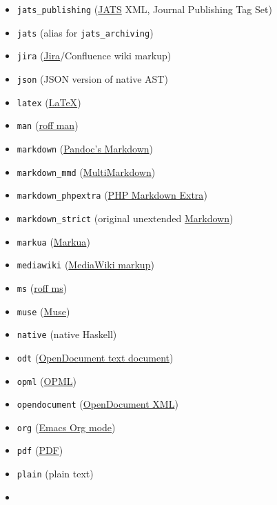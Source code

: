 \documentclass[
]{article}
\begin{document}
\begin{description}
\begin{itemize}
\item
  \texttt{jats\_publishing} (\href{https://jats.nlm.nih.gov}{JATS} XML,
  Journal Publishing Tag Set)
\item
  \texttt{jats} (alias for \texttt{jats\_archiving})
\item
  \texttt{jira}
  (\href{https://jira.atlassian.com/secure/WikiRendererHelpAction.jspa?section=all}{Jira}/Confluence
  wiki markup)
\item
  \texttt{json} (JSON version of native AST)
\item
  \texttt{latex} (\href{https://www.latex-project.org/}{LaTeX})
\item
  \texttt{man} (\href{https://man.cx/groff_man(7)}{roff man})
\item
  \texttt{markdown} (\protect\hyperlink{pandocs-markdown}{Pandoc's
  Markdown})
\item
  \texttt{markdown\_mmd}
  (\href{https://fletcherpenney.net/multimarkdown/}{MultiMarkdown})
\item
  \texttt{markdown\_phpextra}
  (\href{https://michelf.ca/projects/php-markdown/extra/}{PHP Markdown
  Extra})
\item
  \texttt{markdown\_strict} (original unextended
  \href{https://daringfireball.net/projects/markdown/}{Markdown})
\item
  \texttt{markua} (\href{https://leanpub.com/markua/read}{Markua})
\item
  \texttt{mediawiki}
  (\href{https://www.mediawiki.org/wiki/Help:Formatting}{MediaWiki
  markup})
\item
  \texttt{ms} (\href{https://man.cx/groff_ms(7)}{roff ms})
\item
  \texttt{muse} (\href{https://amusewiki.org/library/manual}{Muse})
\item
  \texttt{native} (native Haskell)
\item
  \texttt{odt}
  (\href{https://en.wikipedia.org/wiki/OpenDocument}{OpenDocument text
  document})
\item
  \texttt{opml} (\href{https://opml.org/spec2.opml}{OPML})
\item
  \texttt{opendocument}
  (\href{https://www.oasis-open.org/2021/06/16/opendocument-v1-3-oasis-standard-published/}{OpenDocument
  XML})
\item
  \texttt{org} (\href{https://orgmode.org}{Emacs Org mode})
\item
  \texttt{pdf} (\href{https://www.adobe.com/pdf/}{PDF})
\item
  \texttt{plain} (plain text)
\item

\end{itemize}
\end{description}
\end{document}
